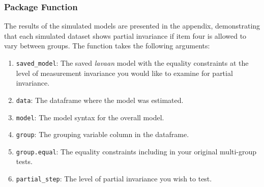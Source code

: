 \documentclass[
  man]{apa7}
\newenvironment{Shaded}{\begin{snugshade}}{\end{snugshade}}
\newcommand{\AttributeTok}[1]{\textcolor[rgb]{0.13,0.29,0.53}{#1}}
\newcommand{\CommentTok}[1]{\textcolor[rgb]{0.56,0.35,0.01}{\textit{#1}}}
\newcommand{\FunctionTok}[1]{\textcolor[rgb]{0.13,0.29,0.53}{\textbf{#1}}}
\newcommand{\NormalTok}[1]{#1}
\newcommand{\OtherTok}[1]{\textcolor[rgb]{0.56,0.35,0.01}{#1}}
\newcommand{\SpecialCharTok}[1]{\textcolor[rgb]{0.81,0.36,0.00}{\textbf{#1}}}
\newcommand{\StringTok}[1]{\textcolor[rgb]{0.31,0.60,0.02}{#1}}
\providecommand{\tightlist}{%
  \setlength{\itemsep}{0pt}\setlength{\parskip}{0pt}}
\begin{document}
\hypertarget{package-function-1}{%
\subsubsection{Package Function}\label{package-function-1}}

The results of the simulated models are presented in the appendix, demonstrating that each simulated dataset shows partial invariance if item four is allowed to vary between groups. The function takes the following arguments:

\begin{enumerate}
\def\labelenumi{\arabic{enumi})}
\tightlist
\item
  \texttt{saved\_model}: The saved \emph{lavaan} model with the equality constraints at the level of measurement invariance you would like to examine for partial invariance.
\item
  \texttt{data}: The dataframe where the model was estimated.
\item
  \texttt{model}: The model syntax for the overall model.
\item
  \texttt{group}: The grouping variable column in the dataframe.
\item
  \texttt{group.equal}: The equality constraints including in your original multi-group tests.
\item
  \texttt{partial\_step}: The level of partial invariance you wish to test.
\end{enumerate}

\small

\begin{Shaded}
\end{Shaded}
\end{document}
